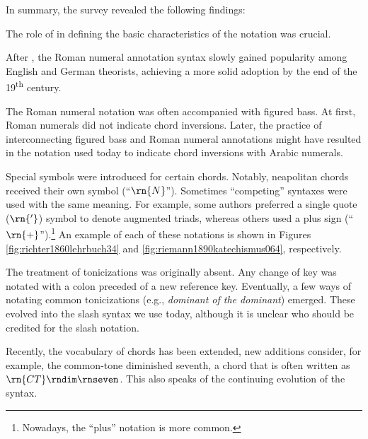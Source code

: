 In summary, the survey revealed the following findings:

The role of \textcite{weber1817versuch} in defining the
basic characteristics of the notation was crucial.


After \textcite{weber1817versuch}, the Roman numeral
annotation syntax slowly gained popularity among English and
German theorists, achieving a more solid adoption by the end
of the 19\textsuperscript{th} century.

 The Roman numeral notation was often accompanied with
figured bass. At first, Roman numerals did not indicate
chord inversions. Later, the practice of interconnecting
figured bass and Roman numeral annotations might have
resulted in the notation used today to indicate chord
inversions with Arabic numerals.

Special symbols were introduced for certain chords. Notably,
\gls{neapolitan} chords received their own symbol
(``$\rn{N}$''). Sometimes ``competing'' syntaxes were used
with the same meaning. For example, some authors preferred a
single quote ($\rn{'}$) symbol to denote augmented triads,
whereas others used a plus sign
(``$\rn{+}$'').\footnote{Nowadays, the ``plus'' notation is
more common.} An example of each of these notations is shown
in Figures \ref{fig:richter1860lehrbuch34} and
\ref{fig:riemann1890katechismus064}, respectively.

The treatment of tonicizations was originally absent. Any
change of key was notated with a colon preceded of a new
reference key. Eventually, a few ways of notating common
tonicizations (e.g., \emph{dominant of the dominant})
emerged. These evolved into the slash syntax we use today,
although it is unclear who should be credited for the slash
notation.

Recently, the vocabulary of chords has been extended, new
additions consider, for example, the common-tone diminished
seventh, a chord that is often written as
$\rn{CT}\rndim\rnseven$. This also speaks of the continuing
evolution of the syntax.
